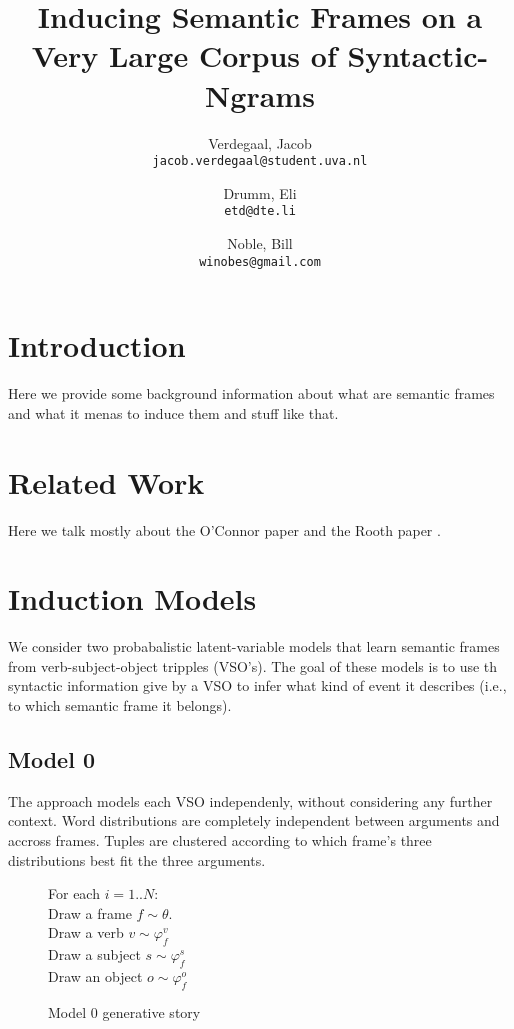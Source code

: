 \documentclass[11pt,twocolumn,DIV=11]{scrartcl}
\author{
    Verdegaal, Jacob\\
    \texttt{jacob.verdegaal@student.uva.nl}
    \and
    Drumm, Eli\\
    \texttt{etd@dte.li}
    \and
    Noble, Bill\\
    \texttt{winobes@gmail.com}
}
\title{Inducing Semantic Frames on a Very Large Corpus of Syntactic-Ngrams}
\renewcommand\phi\varphi
\begin{document}
\maketitle


\section{Introduction}
Here we provide some background information about what are semantic frames and 
what it menas to induce them and stuff like that.


\section{Related Work}
Here we talk mostly about the O'Connor paper \citep{oconnor2013} and the Rooth 
paper \citep{rooth1999}.


\section{Induction Models}

We consider two probabalistic latent-variable models that learn semantic frames
from verb-subject-object tripples (VSO's).
The goal of these models is to use th syntactic information give by a VSO to
infer what kind of event it describes (i.e., to which semantic frame it belongs).

\subsection{Model 0}

The approach models each VSO independenly, without considering any further context.
Word distributions are completely independent between arguments and accross frames.
Tuples are clustered according to which frame's three distributions best fit the 
three arguments.

\begin{figure}

    \begin{snugshade}
    \scriptsize
    For each $i = 1..N$:\\
    \hspace*{15pt} Draw a frame $f \sim \theta$.\\
    \hspace*{15pt} Draw a verb $v \sim \phi_f^v$\\
    \hspace*{15pt} Draw a subject $s \sim \phi_f^s$\\
    \hspace*{15pt} Draw an object $o \sim \phi_f^o$
    \end{snugshade}

    

    \caption{Model 0 generative story}
    \label{gen0}

\end{figure}
\end{document}
